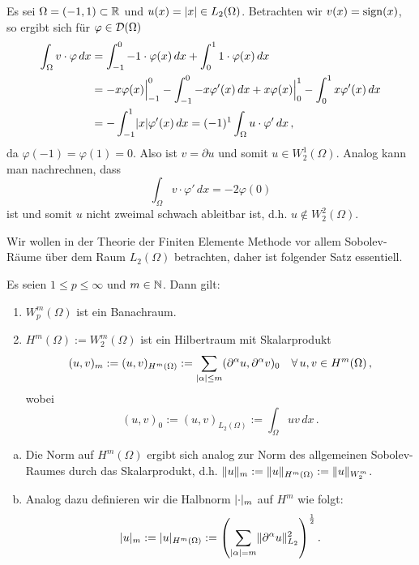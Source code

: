 \begin{bsp}\label{bsp:A.4}
Es sei $\Omega = (-1,1) \subset \mathbb{R}$ und $u (x) = \lvert x\rvert \in L_2(\Omega)$. Betrachten wir $v (x) = \operatorname{sign} (x)$, so ergibt sich für $\varphi \in \mathcal D(\Omega)$
\begin{align*}
	\int_\Omega v \cdot \varphi \, dx & = \int_{-1}^0 -1 \cdot \varphi(x) \, dx + \int_0^1 1\cdot \varphi(x) \, dx  \\
	&= -x\varphi(x)\Big|_{-1}^0 - \int_{-1}^0 -x \varphi'(x) \, dx +  x \varphi(x)\Big|_0^1 -\int_0^1 x \varphi'(x) \, dx \\
	& = - \int_{-1}^1 \lvert x\rvert \varphi'(x) \, dx = (-1)^1 \int_\Omega u \cdot \varphi' \, dx \, ,
\end{align*}
da $\varphi(-1) = \varphi(1) = 0$. Also ist $v = \partial u$ und somit $u \in W^1_2(\Omega)$. Analog kann man nachrechnen, dass 
\[
	\int_\Omega v \cdot \varphi' \, dx = -2\varphi(0)
\]
ist und somit $u$ nicht zweimal schwach ableitbar ist, d.h. $u \not \in W^2_2(\Omega)$.
\end{bsp}

Wir wollen in der Theorie der Finiten Elemente Methode vor allem Sobolev-Räume über dem Raum $L_2(\Omega)$ betrachten, daher ist folgender Satz essentiell.

\begin{satz}\label{satz:A.5}
Es seien $1\le p \le \infty$ und $m \in \mathbb{N}$. Dann gilt:
\begin{enumerate}[\rm (a)]
\item $W_p^m(\Omega)$ ist ein Banachraum.
\item $H^m(\Omega) := W_2^m(\Omega)$ ist ein Hilbertraum mit Skalarprodukt
\[
	(u,v)_m := (u,v)_{H^m(\Omega)} := \sum_{\lvert \alpha\rvert \le m} (\partial^\alpha u,\partial^\alpha v)_0\quad \forall \, u,v \in H^m(\Omega) \, ,
\]
wobei
\[
	(u,v)_0 := (u,v)_{L_2(\Omega)} := \int_\Omega uv \, dx \, .
\]
\end{enumerate}
\end{satz}

\begin{bem}\label{bem:A.6}
\begin{enumerate}[(a)]
\item Die Norm auf $H^m(\Omega)$ ergibt sich analog zur Norm des allgemeinen Sobolev-Raumes durch das Skalarprodukt, d.h. $\lVert u\rVert_m: = \lVert u\rVert_{H^m(\Omega)} := \lVert u\rVert_{W^m_2}$.
\item Analog dazu definieren wir die Halbnorm $\lvert \cdot\rvert_m$ auf $H^m$ wie folgt:
\[
		\lvert u\rvert_m: = \lvert u\rvert_{H^m(\Omega)} :=  \left(
    \sum_{\lvert \alpha\rvert= m}\lVert \partial^\alpha u\rVert^2_{L_2}
  \right)^{\frac 12}.
\]
\end{enumerate}
\end{bem}

